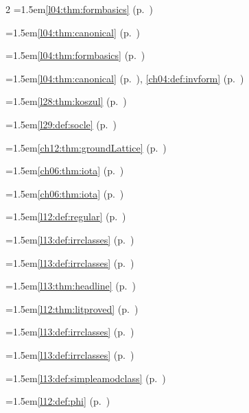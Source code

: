 \begin{multicols}{2}
\hangindent=1.5em\quad \ref{l04:thm:formbasics} (p.~\pageref{l04:thm:formbasics})\par
\hangindent=1.5em\quad \ref{l04:thm:canonical} (p.~\pageref{l04:thm:canonical})\par
\hangindent=1.5em\quad \ref{l04:thm:formbasics} (p.~\pageref{l04:thm:formbasics})\par
\hangindent=1.5em\quad \ref{l04:thm:canonical} (p.~\pageref{l04:thm:canonical}), \ref{ch04:def:invform} (p.~\pageref{ch04:def:invform})\par
\hangindent=1.5em\quad \ref{l28:thm:koszul} (p.~\pageref{l28:thm:koszul})\par
\hangindent=1.5em\quad \ref{l29:def:socle} (p.~\pageref{l29:def:socle})\par
\hangindent=1.5em\quad \ref{ch12:thm:groundLattice} (p.~\pageref{ch12:thm:groundLattice})\par
\hangindent=1.5em\quad \ref{ch06:thm:iota} (p.~\pageref{ch06:thm:iota})\par
\hangindent=1.5em\quad \ref{ch06:thm:iota} (p.~\pageref{ch06:thm:iota})\par
\hangindent=1.5em\quad \ref{l12:def:regular} (p.~\pageref{l12:def:regular})\par
\hangindent=1.5em\quad \ref{l13:def:irrclasses} (p.~\pageref{l13:def:irrclasses})\par
\hangindent=1.5em\quad \ref{l13:def:irrclasses} (p.~\pageref{l13:def:irrclasses})\par
\hangindent=1.5em\quad \ref{l13:thm:headline} (p.~\pageref{l13:thm:headline})\par
\hangindent=1.5em\quad \ref{l12:thm:litproved} (p.~\pageref{l12:thm:litproved})\par
\hangindent=1.5em\quad \ref{l13:def:irrclasses} (p.~\pageref{l13:def:irrclasses})\par
\hangindent=1.5em\quad \ref{l13:def:irrclasses} (p.~\pageref{l13:def:irrclasses})\par
\hangindent=1.5em\quad \ref{l13:def:simpleamodclass} (p.~\pageref{l13:def:simpleamodclass})\par
\hangindent=1.5em\quad \ref{l12:def:phi} (p.~\pageref{l12:def:phi})\par

\end{multicols}
